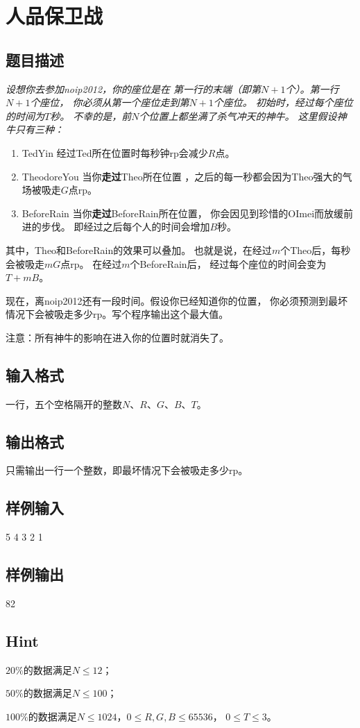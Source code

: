 \section{人品保卫战}
\subsection{题目描述}
\par { \itshape 
	设想你去参加noip2012，你的座位是在
		第一行的末端（即第$N+1$个）。第一行$N + 1$个座位，
		你必须从第一个座位走到第$N+1$个座位。
		初始时，经过每个座位的时间为$T$秒。
		不幸的是，前$N$个位置上都坐满了杀气冲天的神牛。
		这里假设神牛只有三种：
		\begin{enumerate}
	\item TedYin 经过Ted所在位置时每秒钟rp会减少$R$点。
		\item TheodoreYou 当你{\textbf{走过}}Theo所在位置
		，之后的每一秒都会因为Theo强大的气场被吸走$G$点rp。
		\item BeforeRain 当你{\textbf{走过}}BeforeRain所在位置，
		你会因见到珍惜的OImei而放缓前进的步伐。
		即经过之后每个人的时间会增加$B$秒。
	\end{enumerate}
	\par 其中，Theo和BeforeRain的效果可以叠加。
		也就是说，在经过$m$个Theo后，每秒会被吸走$mG$点rp。
		在经过$m$个BeforeRain后，
		经过每个座位的时间会变为$T + mB$。
}
\newline
\par 现在，离noip2012还有一段时间。假设你已经知道你的位置，
你必须预测到最坏情况下会被吸走多少rp。写个程序输出这个最大值。\par
注意：所有神牛的影响在进入你的位置时就消失了。

\subsection{输入格式}
一行，五个空格隔开的整数$N$、$R$、$G$、$B$、$T$。 
\subsection{输出格式}
只需输出一行一个整数，即最坏情况下会被吸走多少rp。
\subsection{样例输入}
5 4 3 2 1
\subsection{样例输出}
82
\subsection{Hint}
\par
$20\%$的数据满足$N \le 12$；
\par
$50\%$的数据满足$N \le 100$；
\par
$100\%$的数据满足$N \le 1024$，$0 \le R, G, B \le 65536$， $0 \le T \le 3$。
